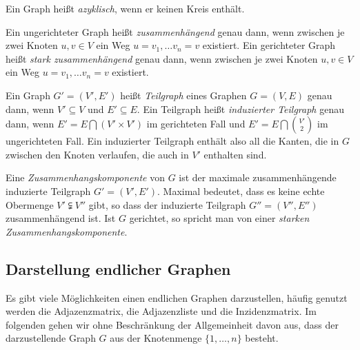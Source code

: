 \begin{Def}
  \hspace{\parindent}Ein Graph heißt \textit{azyklisch}, wenn er keinen Kreis enthält.
\end{Def}

\begin{Def}
  \hspace{\parindent}Ein ungerichteter Graph heißt \textit{zusammenhängend} genau dann, wenn zwischen je zwei Knoten $u,v \in V$ ein Weg $u=v_1, \ldots v_n = v$ existiert. Ein gerichteter Graph heißt \textit{stark zusammenhängend} genau dann, wenn zwischen je zwei Knoten $u,v \in V$ ein Weg $u=v_1, \ldots v_n = v$ existiert.
\end{Def}

\begin{Def}[Teilgraph]
  \hspace{\parindent}Ein Graph $G' = (V', E')$ heißt \textit{Teilgraph} eines Graphen $G=(V,E)$ genau dann, wenn $V' \subseteq V$ und $E' \subseteq E$. Ein Teilgraph heißt \textit{induzierter Teilgraph} genau dann, wenn $E' = E \bigcap (V' \times V')$ im gerichteten Fall und $E' = E \bigcap \binom{V'}{2}$ im ungerichteten Fall. Ein induzierter Teilgraph enthält also all die Kanten, die in $G$ zwischen den Knoten verlaufen, die auch in $V'$ enthalten sind.
\end{Def}

\begin{Def}[Zusammenhangskomponente]
  \hspace{\parindent}Eine \textit{Zusammenhangskomponente} von $G$ ist der maximale zusammenhängende induzierte Teilgraph $G' = (V', E')$. Maximal bedeutet, dass es keine echte Obermenge $V' \subsetneqq V''$ gibt, so dass der induzierte Teilgraph $G''=(V'', E'')$ zusammenhängend ist. Ist $G$ gerichtet, so spricht man von einer \textit{starken Zusammenhangskomponente}.
\end{Def}

\subsection{Darstellung endlicher Graphen}
Es gibt viele Möglichkeiten einen endlichen Graphen darzustellen, häufig genutzt werden die Adjazenzmatrix, die Adjazenzliste und die Inzidenzmatrix. Im folgenden gehen wir ohne Beschränkung der Allgemeinheit davon aus, dass der darzustellende Graph $G$ aus der Knotenmenge $\{ 1, \ldots, n \}$ besteht.

